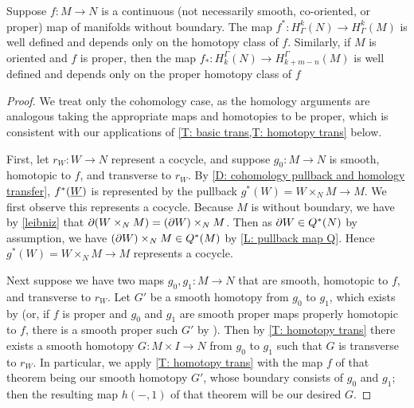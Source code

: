 \begin{proposition}\label{P: cohomology pullback}
	Suppose $f \colon M \to N$ is a continuous (not necessarily smooth, co-oriented, or proper) map of manifolds without boundary.
	The map $f^* \colon H^k_\Gamma(N) \to H^k_\Gamma(M)$ is well defined and depends only on the homotopy class of $f$.
	Similarly, if $M$ is oriented and $f$ is proper, then the map $f_* \colon H_k^\Gamma(N) \to H_{k+m-n}^\Gamma(M)$ is well defined and depends only on the proper homotopy class of $f$
\end{proposition}

\begin{proof}
	We treat only the cohomology case, as the homology arguments are analogous taking the appropriate maps and homotopies to be proper, which is consistent with our applications of \cref{T: basic trans,T: homotopy trans} below.

	First, let $r_W \colon W \to N$ represent a cocycle, and suppose $g_0 \colon M \to N$ is smooth, homotopic to $f$, and transverse to $r_W$.
	By \cref{D: cohomology pullback and homology transfer}, $f^*(\underline{W})$ is represented by the pullback $g^*(W) = W \times_N M \to M$.
	We first observe this represents a cocycle.
	Because  $M$ is without boundary, we have by \cref{leibniz} that $\partial(W\times_N M) = (\partial W) \times_N M$.
	Then as $\partial W \in Q^*(N)$ by assumption, we have $(\partial W) \times_N M \in Q^*(M)$ by \cref{L: pullback map Q}.
	Hence $g^*(W) = W \times_N M \to M$ represents a cocycle.

	Next suppose we have two maps $g_0, g_1 \colon M \to N$ that are smooth, homotopic to $f$, and transverse to $r_W$.
	Let $G'$ be a smooth homotopy from $g_0$ to $g_1$, which exists by \cite[Proposition 9.2.33]{MaDo92} (or, if $f$ is proper and $g_0$ and $g_1$ are smooth proper maps properly homotopic to $f$, there is a smooth proper such $G'$ by \cite[Proposition 9.2.35]{MaDo92}).
	Then by \cref{T: homotopy trans} there exists a smooth homotopy $G \colon M \times I \to N$ from $g_0$ to $g_1$ such that $G$ is transverse to $r_W$.
	In particular, we apply \cref{T: homotopy trans} with the map $f$ of that theorem being our smooth homotopy $G'$, whose boundary consists of $g_0$ and $g_1$; then the resulting map $h(-,1)$ of that theorem will be our desired $G$.


\end{proof}
